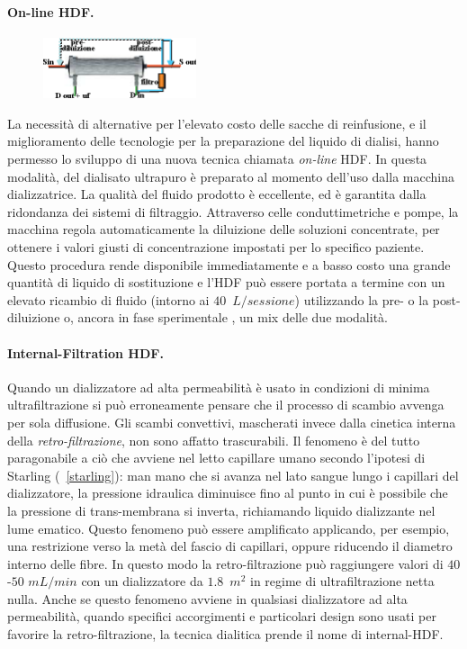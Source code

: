\paragraph{On-line HDF.}
\begin{figure}
	\centering
	\vspace{-10pt}
		\includegraphics[width=0.40\textwidth]{immagini/onlineHDF.eps}
		\vspace{-20pt}
\end{figure}
La necessità di alternative per l'elevato costo delle sacche di reinfusione, e il miglioramento delle tecnologie per la preparazione del liquido di dialisi, hanno permesso lo sviluppo di una nuova tecnica chiamata \textit{on-line} HDF. In questa modalità, del dialisato ultrapuro è preparato al momento dell'uso dalla macchina dializzatrice. La qualità del fluido prodotto è eccellente, ed è garantita dalla ridondanza dei sistemi di filtraggio. Attraverso celle conduttimetriche e pompe, la macchina regola automaticamente la diluizione delle soluzioni concentrate, per ottenere i valori giusti di concentrazione impostati per lo specifico paziente. Questo procedura rende disponibile immediatamente e a basso costo una grande quantità di liquido di sostituzione e l'HDF può essere portata a termine con un elevato ricambio di fluido (intorno ai $40$~$L/sessione$) utilizzando la pre- o la post-diluizione o, ancora in fase sperimentale \cite{pedrini}, un mix delle due modalità.

\paragraph{Internal-Filtration HDF.}
Quando un dializzatore ad alta permeabilità è usato in condizioni di minima ultrafiltrazione si può erroneamente pensare che il processo di scambio avvenga per sola diffusione. Gli scambi convettivi, mascherati invece dalla cinetica interna della \textit{retro-filtrazione}, non sono affatto trascurabili. Il fenomeno è del tutto paragonabile a ciò che avviene nel letto capillare umano secondo l'ipotesi di Starling (\figurename~\ref{starling}): man mano che si avanza nel lato sangue lungo i capillari del dializzatore, la pressione idraulica diminuisce fino al punto in cui è possibile che la pressione di trans-membrana si inverta, richiamando liquido dializzante nel lume ematico. Questo fenomeno può essere amplificato applicando, per esempio, una restrizione verso la metà del fascio di capillari, oppure riducendo il diametro interno delle fibre. In questo modo la retro-filtrazione può raggiungere valori di $40$-$50$ $mL/min$ con un dializzatore da $1.8$~$m^2$ in regime di ultrafiltrazione netta nulla. Anche se questo fenomeno avviene in qualsiasi dializzatore ad alta permeabilità, quando specifici accorgimenti e particolari design sono usati per favorire la retro-filtrazione, la tecnica dialitica prende il nome di internal-HDF.

